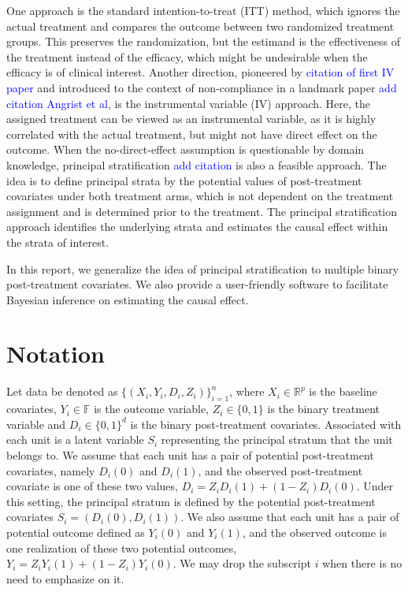 \documentclass{article}
\begin{document}
One approach is the standard intention-to-treat (ITT) method, which ignores the actual treatment and compares the outcome between two randomized treatment groups. This preserves the randomization, but the estimand is the effectiveness of the treatment instead of the efficacy, which might be undesirable when the efficacy is of clinical interest. Another direction, pioneered by \textcolor{blue}{citation of first IV paper} and introduced to the context of non-compliance in a landmark paper \textcolor{blue}{add citation Angrist et al}, is the instrumental variable (IV) approach. Here, the assigned treatment can be viewed as an instrumental variable, as it is highly correlated with the actual treatment, but might not have direct effect on the outcome. When the no-direct-effect assumption is questionable by domain knowledge, principal stratification \textcolor{blue}{add citation} is also a feasible approach. The idea is to define principal strata by the potential values of post-treatment covariates under both treatment arms, which is not dependent on the treatment assignment and is determined prior to the treatment. The principal stratification approach identifies the underlying strata and estimates the causal effect within the strata of interest.

In this report, we generalize the idea of principal stratification to multiple binary post-treatment covariates. We also provide a user-friendly software to facilitate Bayesian inference on estimating the causal effect.

\section{Notation}

Let data be denoted as $\{(X_i, Y_i, D_i, Z_i)\}_{i=1}^n$, where $X_i\in \mathbb{R}^p$ is the baseline covariates, $Y_i \in \mathbb{F}$ is the outcome variable, $Z_i \in \{0, 1\}$ is the binary treatment variable and $D_i \in \{0, 1\}^d$ is the binary post-treatment covariates. Associated with each unit is a latent variable $S_i$ representing the principal stratum that the unit belongs to. We assume that each unit has a pair of potential post-treatment covariates, namely $D_i(0)$ and $D_i(1)$, and the observed post-treatment covariate is one of these two values, $D_i = Z_i D_i(1) + (1 - Z_i) D_i(0)$. Under this setting, the principal stratum is defined by the potential post-treatment covariates $S_i = (D_i(0), D_i(1))$. We also assume that each unit has a pair of potential outcome defined as $Y_i(0)$ and $Y_i(1)$, and the observed outcome is one realization of these two potential outcomes, $Y_i = Z_i Y_i(1) + (1 - Z_i)Y_i(0)$. We may drop the subscript $i$ when there is no need to emphasize on it.
\end{document}
